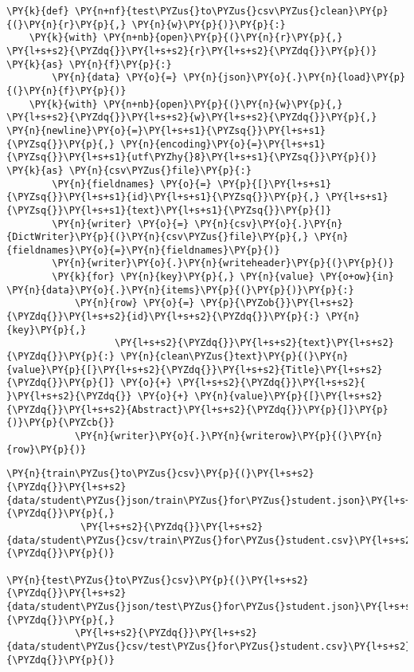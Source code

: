 \documentclass[../main.tex]{subfiles}
\begin{document}
\begin{tcolorbox}[breakable, size=fbox, boxrule=1pt, pad at break*=1mm,colback=cellbackground, colframe=cellborder]
\begin{Verbatim}[commandchars=\\\{\}]
\PY{k}{def} \PY{n+nf}{test\PYZus{}to\PYZus{}csv\PYZus{}clean}\PY{p}{(}\PY{n}{r}\PY{p}{,} \PY{n}{w}\PY{p}{)}\PY{p}{:}
    \PY{k}{with} \PY{n+nb}{open}\PY{p}{(}\PY{n}{r}\PY{p}{,} \PY{l+s+s2}{\PYZdq{}}\PY{l+s+s2}{r}\PY{l+s+s2}{\PYZdq{}}\PY{p}{)} \PY{k}{as} \PY{n}{f}\PY{p}{:}
        \PY{n}{data} \PY{o}{=} \PY{n}{json}\PY{o}{.}\PY{n}{load}\PY{p}{(}\PY{n}{f}\PY{p}{)}
    \PY{k}{with} \PY{n+nb}{open}\PY{p}{(}\PY{n}{w}\PY{p}{,} \PY{l+s+s2}{\PYZdq{}}\PY{l+s+s2}{w}\PY{l+s+s2}{\PYZdq{}}\PY{p}{,} \PY{n}{newline}\PY{o}{=}\PY{l+s+s1}{\PYZsq{}}\PY{l+s+s1}{\PYZsq{}}\PY{p}{,} \PY{n}{encoding}\PY{o}{=}\PY{l+s+s1}{\PYZsq{}}\PY{l+s+s1}{utf\PYZhy{}8}\PY{l+s+s1}{\PYZsq{}}\PY{p}{)} \PY{k}{as} \PY{n}{csv\PYZus{}file}\PY{p}{:}
        \PY{n}{fieldnames} \PY{o}{=} \PY{p}{[}\PY{l+s+s1}{\PYZsq{}}\PY{l+s+s1}{id}\PY{l+s+s1}{\PYZsq{}}\PY{p}{,} \PY{l+s+s1}{\PYZsq{}}\PY{l+s+s1}{text}\PY{l+s+s1}{\PYZsq{}}\PY{p}{]}
        \PY{n}{writer} \PY{o}{=} \PY{n}{csv}\PY{o}{.}\PY{n}{DictWriter}\PY{p}{(}\PY{n}{csv\PYZus{}file}\PY{p}{,} \PY{n}{fieldnames}\PY{o}{=}\PY{n}{fieldnames}\PY{p}{)}
        \PY{n}{writer}\PY{o}{.}\PY{n}{writeheader}\PY{p}{(}\PY{p}{)}
        \PY{k}{for} \PY{n}{key}\PY{p}{,} \PY{n}{value} \PY{o+ow}{in} \PY{n}{data}\PY{o}{.}\PY{n}{items}\PY{p}{(}\PY{p}{)}\PY{p}{:}
            \PY{n}{row} \PY{o}{=} \PY{p}{\PYZob{}}\PY{l+s+s2}{\PYZdq{}}\PY{l+s+s2}{id}\PY{l+s+s2}{\PYZdq{}}\PY{p}{:} \PY{n}{key}\PY{p}{,}
                   \PY{l+s+s2}{\PYZdq{}}\PY{l+s+s2}{text}\PY{l+s+s2}{\PYZdq{}}\PY{p}{:} \PY{n}{clean\PYZus{}text}\PY{p}{(}\PY{n}{value}\PY{p}{[}\PY{l+s+s2}{\PYZdq{}}\PY{l+s+s2}{Title}\PY{l+s+s2}{\PYZdq{}}\PY{p}{]} \PY{o}{+} \PY{l+s+s2}{\PYZdq{}}\PY{l+s+s2}{ }\PY{l+s+s2}{\PYZdq{}} \PY{o}{+} \PY{n}{value}\PY{p}{[}\PY{l+s+s2}{\PYZdq{}}\PY{l+s+s2}{Abstract}\PY{l+s+s2}{\PYZdq{}}\PY{p}{]}\PY{p}{)}\PY{p}{\PYZcb{}}
            \PY{n}{writer}\PY{o}{.}\PY{n}{writerow}\PY{p}{(}\PY{n}{row}\PY{p}{)}
\end{Verbatim}
\end{tcolorbox}

    \begin{tcolorbox}[breakable, size=fbox, boxrule=1pt, pad at break*=1mm,colback=cellbackground, colframe=cellborder]
\begin{Verbatim}[commandchars=\\\{\}]
\PY{n}{train\PYZus{}to\PYZus{}csv}\PY{p}{(}\PY{l+s+s2}{\PYZdq{}}\PY{l+s+s2}{data/student\PYZus{}json/train\PYZus{}for\PYZus{}student.json}\PY{l+s+s2}{\PYZdq{}}\PY{p}{,}
             \PY{l+s+s2}{\PYZdq{}}\PY{l+s+s2}{data/student\PYZus{}csv/train\PYZus{}for\PYZus{}student.csv}\PY{l+s+s2}{\PYZdq{}}\PY{p}{)}

\PY{n}{test\PYZus{}to\PYZus{}csv}\PY{p}{(}\PY{l+s+s2}{\PYZdq{}}\PY{l+s+s2}{data/student\PYZus{}json/test\PYZus{}for\PYZus{}student.json}\PY{l+s+s2}{\PYZdq{}}\PY{p}{,}
            \PY{l+s+s2}{\PYZdq{}}\PY{l+s+s2}{data/student\PYZus{}csv/test\PYZus{}for\PYZus{}student.csv}\PY{l+s+s2}{\PYZdq{}}\PY{p}{)}
\end{Verbatim}
\end{tcolorbox}
\end{document}
